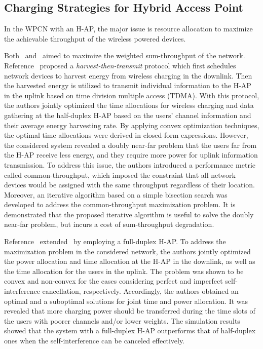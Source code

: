 \documentclass[twocolumn,10pt]{IEEEtran}
\begin{document}
\subsection{Charging Strategies for Hybrid Access Point}

In the WPCN with an H-AP, the major issue is resource allocation to maximize the achievable throughput of the wireless powered devices.    


Both~\cite{H.2014Ju} and~\cite{2014H.Ju} aimed to maximize the weighted sum-throughput of the network. Reference~\cite{H.2014Ju} proposed a \emph{harvest-then-transmit} protocol which first schedules network devices to harvest energy from wireless charging in the downlink. Then the harvested energy is utilized to transmit individual information to the H-AP in the uplink based on time division multiple access (TDMA). With this protocol, the authors jointly optimized the time allocations for wireless charging and data gathering at the half-duplex H-AP based on the users' channel information and their average energy harvesting rate. By applying convex optimization techniques, the optimal time allocations were derived in closed-form expressions.   However, the considered system revealed a doubly near-far problem that the users far from the H-AP receive less energy, and they require more power for uplink information transmission. To address this issue, the authors introduced a performance metric called common-throughput, which imposed the constraint that all network devices would be assigned with the same throughput regardless of their location. Moreover, an iterative algorithm based on a simple bisection search was developed to address the common-throughput maximization problem. It is demonstrated that the proposed iterative algorithm is useful to solve the doubly near-far problem, but incurs a cost of sum-throughput degradation.



Reference~\cite{2014H.Ju} extended~\cite{H.2014Ju} by employing a full-duplex H-AP. To address the maximization problem in the considered network, the authors jointly optimized the power allocation and time allocation at the H-AP in the downlink, as well as the time allocation for the users in the uplink. The problem was shown to be convex and non-convex for the cases considering perfect and imperfect self-interference cancellation, respectively. Accordingly, the authors obtained an optimal and a suboptimal solutions for joint time and power allocation. It was revealed that more charging power should be transferred during the time slots of the users with poorer channels and/or lower weights. The simulation results showed that the system with a full-duplex H-AP outperforms that of half-duplex ones when the self-interference can be  canceled effectively. 
\end{document}
